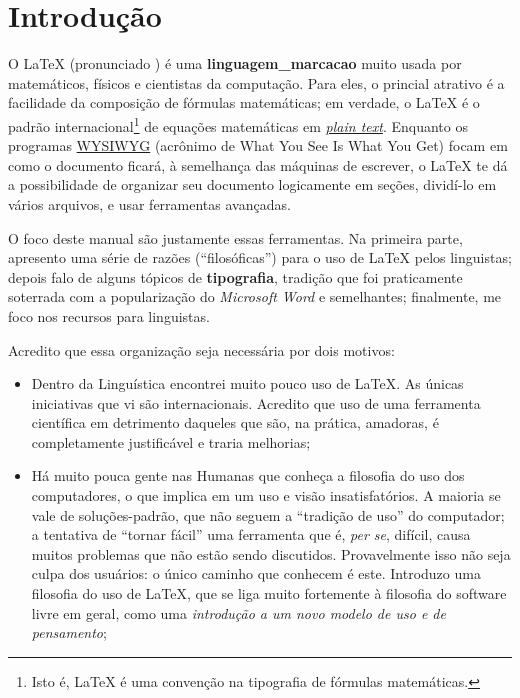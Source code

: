 \chapter{Introdução}

O \LaTeX{} (pronunciado ) é uma \textbf{\gls{linguagem_marcacao}} muito usada por matemáticos, físicos e cientistas da computação. Para eles, o princial atrativo é a facilidade da composição de fórmulas matemáticas; em verdade, o \LaTeX{} é o padrão internacional\footnote{Isto é, \LaTeX{} é uma convenção na tipografia de fórmulas matemáticas.} de equações matemáticas em \href{http://en.wikipedia.org/wiki/Plain_text}{\emph{plain text}}. Enquanto os programas \href{http://en.wikipedia.org/wiki/WYSIWYG}{WYSIWYG} (acrônimo de What You See Is What You Get) focam em como o documento ficará, à semelhança das máquinas de escrever, o \LaTeX{} te dá a possibilidade de organizar seu documento logicamente em seções, dividí-lo em vários arquivos, e usar ferramentas avançadas.

O foco deste manual são justamente essas ferramentas. Na primeira parte, apresento uma série de razões (``filosóficas'') para o uso de \LaTeX{} pelos linguistas; depois falo de alguns tópicos de \textbf{tipografia}, tradição que foi praticamente soterrada com a popularização do \emph{Microsoft Word} e semelhantes; finalmente, me foco nos recursos para linguistas.

Acredito que essa organização seja necessária por dois motivos:

\begin{itemize}
	\item Dentro da Linguística encontrei muito pouco uso de \LaTeX. As únicas iniciativas que vi são internacionais. Acredito que uso de uma ferramenta científica em detrimento daqueles que são, na prática, amadoras, é completamente justificável e traria melhorias;
	\item Há muito pouca gente nas Humanas que conheça a filosofia do uso dos computadores, o que implica em um uso e visão insatisfatórios. A maioria se vale de soluções-padrão, que não seguem a ``tradição de uso'' do computador; a tentativa de ``tornar fácil'' uma ferramenta que é, \emph{per se}, difícil, causa muitos problemas que não estão sendo discutidos. Provavelmente isso não seja culpa dos usuários: o único caminho que conhecem é este. Introduzo uma filosofia do uso de \LaTeX{}, que se liga muito fortemente à filosofia do software livre em geral, como uma \emph{introdução a um novo modelo de uso e de pensamento};
\end{itemize}

